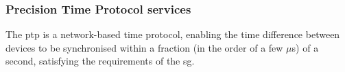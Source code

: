 












 






\subsubsection{Precision Time Protocol services}
The \acrfull{ptp} is a network-based time protocol, enabling the time difference between devices to be synchronised within a fraction (in the order of a few $\mu$s) of a second, satisfying the requirements of the \acrshort{sg}. 

